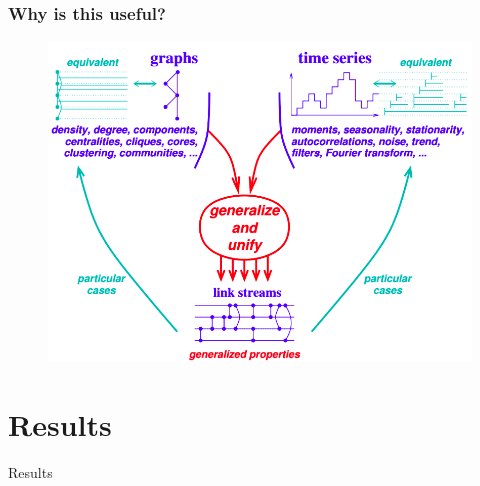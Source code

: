 \documentclass{beamer}
\begin{document}
\begin{frame}
\begin{center}
\begin{figure}
		\end{figure}
	\end{center}
\end{frame}


\begin{frame}
	\frametitle{Why is this useful?}	
	\begin{center}
		\begin{figure}
			\includegraphics[width=.8\linewidth]{./figures/stream_unification}
		\end{figure}
	\end{center}
\end{frame}


\section{Results}

\begin{frame}
	\Huge{\centerline{Results}}
\end{frame}
\end{document}
